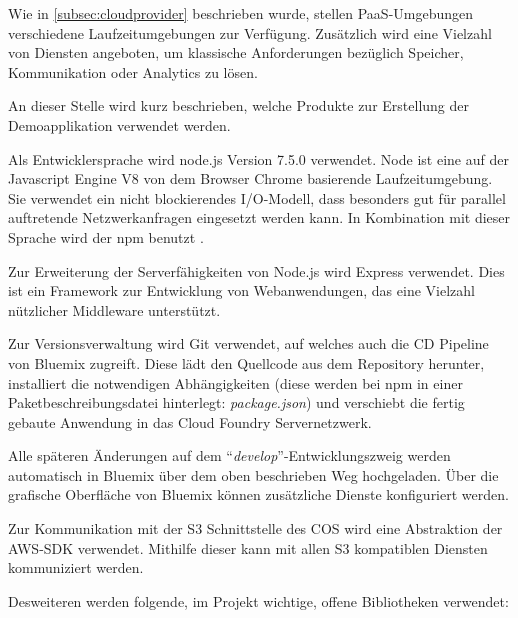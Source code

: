Wie in \autoref{subsec:cloudprovider} beschrieben wurde, stellen \acs{PaaS}-Umgebungen verschiedene Laufzeitumgebungen zur Verfügung. Zusätzlich wird eine Vielzahl von Diensten angeboten, um klassische Anforderungen bezüglich Speicher, Kommunikation oder Analytics zu lösen.

An dieser Stelle wird kurz beschrieben, welche Produkte zur Erstellung der Demoapplikation verwendet werden. 

Als Entwicklersprache wird node.js Version 7.5.0 verwendet. Node ist eine auf der Javascript Engine V8 von dem Browser Chrome basierende Laufzeitumgebung. Sie verwendet ein nicht blockierendes I/O-Modell, dass besonders gut für parallel auftretende Netzwerkanfragen eingesetzt werden kann. In Kombination mit dieser Sprache wird der \ac{npm} benutzt \parencite{nodejs.2017}.

Zur Erweiterung der Serverfähigkeiten von Node.js wird Express verwendet. Dies ist ein Framework zur Entwicklung von Webanwendungen, das eine Vielzahl nützlicher Middleware unterstützt.

Zur Versionsverwaltung wird \gls{Git} verwendet, auf welches auch die \ac{CD} Pipeline von Bluemix zugreift. Diese lädt den Quellcode aus dem Repository herunter, installiert die notwendigen Abhängigkeiten (diese werden bei \acs{npm} in einer Paketbeschreibungsdatei hinterlegt: \textit{package.json}) und verschiebt die fertig gebaute Anwendung in das Cloud Foundry Servernetzwerk.  

Alle späteren Änderungen auf dem ``\textit{develop}''-Entwicklungszweig werden automatisch in Bluemix über dem oben beschrieben Weg hochgeladen. Über die grafische Oberfläche von Bluemix können zusätzliche Dienste konfiguriert werden.

Zur Kommunikation mit der S3 Schnittstelle des \acs{COS} wird eine Abstraktion der \acs{AWS}-\gls{SDK} verwendet. Mithilfe dieser kann mit allen \acs{S3} kompatiblen Diensten kommuniziert werden.

Desweiteren werden folgende, im Projekt wichtige, offene Bibliotheken verwendet:

